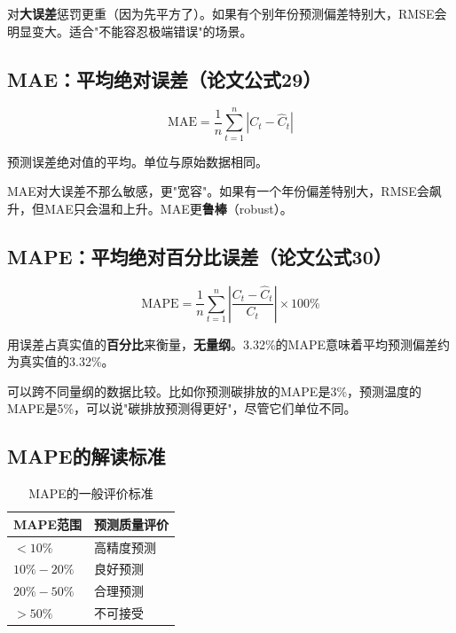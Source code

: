 \documentclass[12pt, a4paper]{article}
\begin{document}
\begin{tipbox}[RMSE的特点]
对\textbf{大误差}惩罚更重（因为先平方了）。如果有个别年份预测偏差特别大，RMSE会明显变大。适合"不能容忍极端错误"的场景。
\end{tipbox}

\subsection{MAE：平均绝对误差（论文公式29）}

\[
\text{MAE} = \frac{1}{n}\sum_{t=1}^{n}|C_t - \hat{C}_t|
\]

\begin{conceptbox}[MAE]
预测误差绝对值的平均。单位与原始数据相同。
\end{conceptbox}

\begin{tipbox}
MAE对大误差不那么敏感，更"宽容"。如果有一个年份偏差特别大，RMSE会飙升，但MAE只会温和上升。MAE更\textbf{鲁棒}（robust）。
\end{tipbox}

\subsection{MAPE：平均绝对百分比误差（论文公式30）}

\[
\text{MAPE} = \frac{1}{n}\sum_{t=1}^{n}\left|\frac{C_t - \hat{C}_t}{C_t}\right| \times 100\%
\]

\begin{conceptbox}[MAPE]
用误差占真实值的\textbf{百分比}来衡量，\textbf{无量纲}。3.32\%的MAPE意味着平均预测偏差约为真实值的3.32\%。
\end{conceptbox}

\begin{tipbox}[MAPE的优势]
可以跨不同量纲的数据比较。比如你预测碳排放的MAPE是3\%，预测温度的MAPE是5\%，可以说"碳排放预测得更好"，尽管它们单位不同。
\end{tipbox}

\subsection{MAPE的解读标准}

\begin{table}[H]
\centering
\begin{tabular}{ll}
\toprule
\textbf{MAPE范围} & \textbf{预测质量评价} \\
\midrule
 $< 10\%$ & 高精度预测 \\
 $10\% - 20\%$ & 良好预测 \\
 $20\% - 50\%$ & 合理预测 \\
 $> 50\%$ & 不可接受 \\
\bottomrule
\end{tabular}
\caption{MAPE的一般评价标准}
\end{table}
\end{document}
